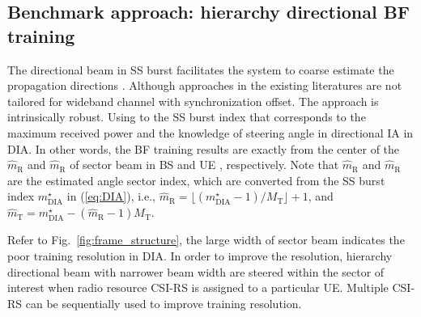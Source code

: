 \documentclass[journal]{IEEEtran}
\newcommand{\tx}[0]{\text{T}}
\newcommand{\rx}[0]{\text{R}}
\newcommand{\ie}[0]{\textit{i.e.}}
\begin{document}
\subsection{Benchmark approach: hierarchy directional BF training}
The directional beam in SS burst facilitates the system to coarse estimate the propagation directions \cite{8323183}. Although approaches in the existing literatures are not tailored for wideband channel with synchronization offset. The approach is intrinsically robust. Using to the SS burst index that corresponds to the maximum received power and the knowledge of steering angle in directional IA in DIA. In other words, the BF training results are exactly from the center of the $\hat{m}_{\rx}$ and $\hat{m}_{\rx}$ of sector beam in BS and UE \cite{8323183}, respectively. Note that $\hat{m}_{\rx}$ and $\hat{m}_{\rx}$ are the estimated angle sector index, which are converted from the SS burst index $m_{\text{DIA}}^{\star}$ in (\ref{eq:DIA}), i.e., $\hat{m}_{\rx} = \lfloor (m_{\text{DIA}}^{\star}-1)/M_{\tx} \rfloor+1$, and $\hat{m}_{\tx} = m_{\text{DIA}}^{\star}-(\hat{m}_{\rx}-1)M_{\tx}$. 

Refer to Fig.~\ref{fig:frame_structure}, the large width of sector beam indicates the poor training resolution in DIA. In order to improve the resolution, hierarchy directional beam with narrower beam width are steered within the sector of interest when radio resource CSI-RS is assigned to a particular UE. Multiple CSI-RS can be sequentially used to improve training resolution.

% 
%

% 
%
\end{document}
